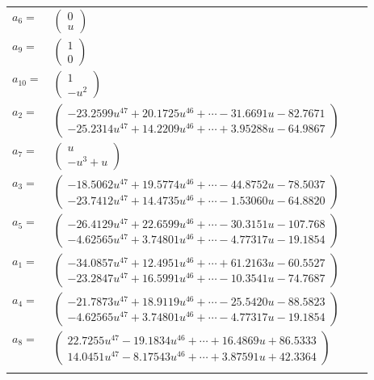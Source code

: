 \documentclass[1p]{elsarticle_modified}
\theoremstyle{definition}
\begin{document}
\begin{tabular}{m{7pt} m{180pt} m{7pt} m{180pt} }
\flushright $a_{6}=$&$\begin{pmatrix}0\\u\end{pmatrix}$ \\
\flushright $a_{9}=$&$\begin{pmatrix}1\\0\end{pmatrix}$ \\
\flushright $a_{10}=$&$\begin{pmatrix}1\\- u^2\end{pmatrix}$ \\
\flushright $a_{2}=$&$\begin{pmatrix}-23.2599 u^{47}+20.1725 u^{46}+\cdots-31.6691 u-82.7671\\-25.2314 u^{47}+14.2209 u^{46}+\cdots+3.95288 u-64.9867\end{pmatrix}$ \\
\flushright $a_{7}=$&$\begin{pmatrix}u\\- u^3+u\end{pmatrix}$ \\
\flushright $a_{3}=$&$\begin{pmatrix}-18.5062 u^{47}+19.5774 u^{46}+\cdots-44.8752 u-78.5037\\-23.7412 u^{47}+14.4735 u^{46}+\cdots-1.53060 u-64.8820\end{pmatrix}$ \\
\flushright $a_{5}=$&$\begin{pmatrix}-26.4129 u^{47}+22.6599 u^{46}+\cdots-30.3151 u-107.768\\-4.62565 u^{47}+3.74801 u^{46}+\cdots-4.77317 u-19.1854\end{pmatrix}$ \\
\flushright $a_{1}=$&$\begin{pmatrix}-34.0857 u^{47}+12.4951 u^{46}+\cdots+61.2163 u-60.5527\\-23.2847 u^{47}+16.5991 u^{46}+\cdots-10.3541 u-74.7687\end{pmatrix}$ \\
\flushright $a_{4}=$&$\begin{pmatrix}-21.7873 u^{47}+18.9119 u^{46}+\cdots-25.5420 u-88.5823\\-4.62565 u^{47}+3.74801 u^{46}+\cdots-4.77317 u-19.1854\end{pmatrix}$ \\
\flushright $a_{8}=$&$\begin{pmatrix}22.7255 u^{47}-19.1834 u^{46}+\cdots+16.4869 u+86.5333\\14.0451 u^{47}-8.17543 u^{46}+\cdots+3.87591 u+42.3364\end{pmatrix}$\\&\end{tabular}
\end{document}
